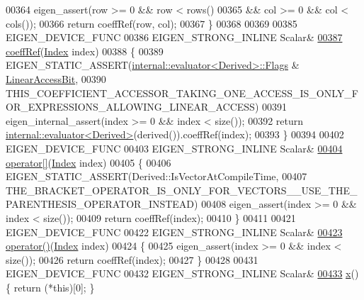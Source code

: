 \begin{DoxyCode}
00364       eigen\_assert(row >= 0 && row < rows()
00365           && col >= 0 && col < cols());
00366       \textcolor{keywordflow}{return} coeffRef(row, col);
00367     \}
00368 
00369 
00385     EIGEN\_DEVICE\_FUNC
00386     EIGEN\_STRONG\_INLINE Scalar&
\hyperlink{group___core___module_a3187593ec72fc6f4fa64a86e0383375b}{00387}     \hyperlink{group___core___module_a3187593ec72fc6f4fa64a86e0383375b}{coeffRef}(\hyperlink{group___core___module_a554f30542cc2316add4b1ea0a492ff02}{Index} index)
00388     \{
00389       EIGEN\_STATIC\_ASSERT(\hyperlink{struct_eigen_1_1internal_1_1evaluator}{internal::evaluator<Derived>::Flags} & 
      \hyperlink{group__flags_ga4b983a15d57cd55806df618ac544d09e}{LinearAccessBit},
00390                           
      THIS\_COEFFICIENT\_ACCESSOR\_TAKING\_ONE\_ACCESS\_IS\_ONLY\_FOR\_EXPRESSIONS\_ALLOWING\_LINEAR\_ACCESS)
00391       eigen\_internal\_assert(index >= 0 && index < size());
00392       \textcolor{keywordflow}{return} \hyperlink{struct_eigen_1_1internal_1_1evaluator}{internal::evaluator<Derived>}(derived()).coeffRef(index);
00393     \}
00394 
00402     EIGEN\_DEVICE\_FUNC
00403     EIGEN\_STRONG\_INLINE Scalar&
\hyperlink{group___core___module_a38f5d78476b3db56db98853af750cf31}{00404}     \hyperlink{group___core___module_a38f5d78476b3db56db98853af750cf31}{operator[]}(\hyperlink{group___core___module_a554f30542cc2316add4b1ea0a492ff02}{Index} index)
00405     \{
00406       EIGEN\_STATIC\_ASSERT(Derived::IsVectorAtCompileTime,
00407                           THE\_BRACKET\_OPERATOR\_IS\_ONLY\_FOR\_VECTORS\_\_USE\_THE\_PARENTHESIS\_OPERATOR\_INSTEAD)
00408       eigen\_assert(index >= 0 && index < size());
00409       \textcolor{keywordflow}{return} coeffRef(index);
00410     \}
00411 
00421     EIGEN\_DEVICE\_FUNC
00422     EIGEN\_STRONG\_INLINE Scalar&
\hyperlink{group___core___module_a49d29adf378f99cd8ab048bff8a3f881}{00423}     \hyperlink{group___core___module_a49d29adf378f99cd8ab048bff8a3f881}{operator()}(\hyperlink{group___core___module_a554f30542cc2316add4b1ea0a492ff02}{Index} index)
00424     \{
00425       eigen\_assert(index >= 0 && index < size());
00426       \textcolor{keywordflow}{return} coeffRef(index);
00427     \}
00428 
00431     EIGEN\_DEVICE\_FUNC
00432     EIGEN\_STRONG\_INLINE Scalar&
\hyperlink{group___core___module_a2a9ca10b9ee750cefc5f914f215cba18}{00433}     \hyperlink{group___core___module_a2a9ca10b9ee750cefc5f914f215cba18}{x}() \{ \textcolor{keywordflow}{return} (*\textcolor{keyword}{this})[0]; \}

\end{DoxyCode}
